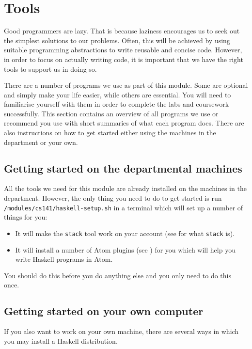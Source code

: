 \chapter{Tools}
\label{ch:tools}

Good programmers are lazy. That is because laziness encourages us to seek out the simplest solutions to our problems. Often, this will be achieved by using suitable programming abstractions to write reusable and concise code. However, in order to focus on actually writing code, it is important that we have the right tools to support us in doing so. 

There are a number of programs we use as part of this module. Some are optional and simply make your life easier, while others are essential. You will need to familiarise yourself with them in order to complete the labs and coursework successfully. This section contains an overview of all programs we use or recommend you use with short summaries of what each program does. There are also instructions on how to get started either using the machines in the department or your own.

\section{Getting started on the departmental machines}
\label{sec:department-setup}

All the tools we need for this module are already installed on the machines in the department. However, the only thing you need to do to get started is run \texttt{\small /modules/cs141/haskell-setup.sh} in a terminal which will set up a number of things for you:
\begin{itemize}
	\item It will make the \texttt{\small stack} tool work on your account (see  for what \texttt{\small stack} is).
	\item It will install a number of Atom plugins (see ) for you which will help you write Haskell programs in Atom. 
\end{itemize}
You should do this before you do anything else and you only need to do this once.

\section{Getting started on your own computer}
\label{sec:home-setup}

If you also want to work on your own machine, there are several ways in which you may install a Haskell distribution.

